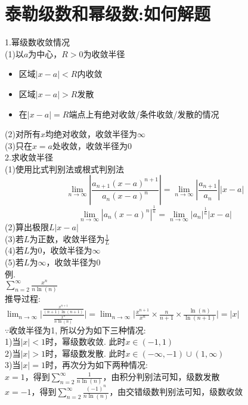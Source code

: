 \chapter{泰勒级数和幂级数:如何解题}
\begin{center}
\end{center}

\begin{center}
\end{center}

1.幂级数收敛情况\\
(1)以$a$为中心，$R>0$为收敛半径
\begin{itemize}
\item 区域$|x-a|<R$内收敛
\item 区域$|x-a|>R$发散
\item 在$|x-a|=R$端点上有绝对收敛/条件收敛/发散的情况
\end{itemize}
(2)对所有$x$均绝对收敛，收敛半径为$\infty$\\
(3)只在$x=a$处收敛，收敛半径为$0$\\[2ex]

2.求收敛半径\\
(1)使用比式判别法或根式判别法\\
\[\lim_{n\to\infty}|\frac{a_{n+1}(x-a)^{n+1}}{a_n(x-a)^n}|=\lim_{n\to\infty}|\frac{a_{n+1}}{a_n}||x-a|\]
\[\lim_{n\to\infty}|a_n(x-a)^n|^{\frac{1}{n}}=\lim_{n\to\infty}|a_n|^{\frac{1}{n}}|x-a|\]
(2)算出极限$L|x-a|$\\
(3)若$L$为正数，收敛半径为$\displaystyle\frac{1}{L}$\\
(4)若$L$为$0$，收敛半径为$\infty$\\
(5)若$L$为$\infty$，收敛半径为$0$\\
例.\\
$\displaystyle\sum_{n=2}^{\infty}\frac{x^n}{n\ln(n)}$\\
推导过程:\\[1ex]
$\displaystyle\lim_{n\to\infty}\bigg|\frac{\frac{x^{n+1}}{(n+1)\ln(n+1)}}{\frac{x^n}{n\ln(n)}}\bigg|=\lim_{n\to\infty}\Big|\frac{x^{n+1}}{x^n}\times\frac{n}{n+1}\times\frac{\ln(n)}{\ln(n+1)}\Big|=|x|$\\[1ex]
$\because$收敛半径为1, 所以分为如下三种情况:\\
1)当$|x|<1$时，幂级数收敛. 此时$x\in(-1,1)$\\
2)当$|x|>1$时，幂级数发散. 此时$x\in(-\infty,-1)\cup(1,\infty)$\\
3)当$|x|=1$时，再次分为如下两种情况:\\[1ex]
\phantom{\qquad}$x=1$，得到$\displaystyle\sum_{n=2}^{\infty}\frac{1}{n\ln(n)}$，由积分判别法可知，级数发散\\[1ex]
\phantom{\qquad}$x=-1$，得到$\displaystyle\sum_{n=2}^{\infty}\frac{(-1)^n}{n\ln(n)}$，由交错级数判别法可知，级数收敛\\[2ex]

